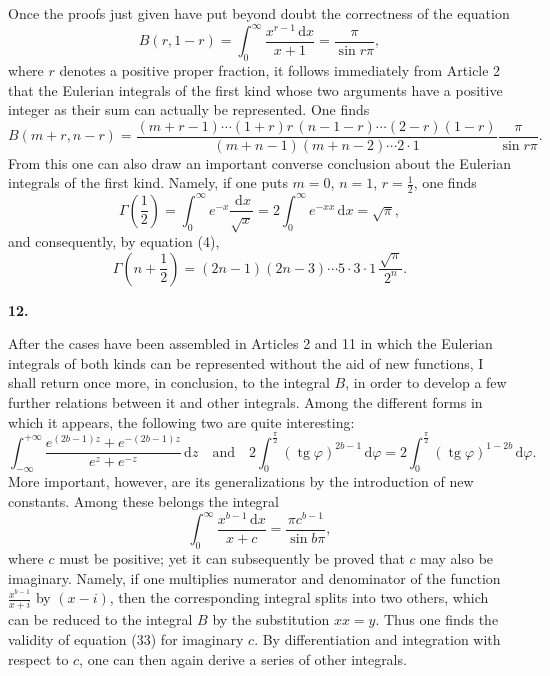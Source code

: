 \documentclass[11pt]{article}
\newcommand{\dd}{\,\mathrm d}
\newcommand{\art}[1]{\bigskip\begin{center}\large\bfseries #1.\end{center}\nopagebreak}
\newcommand{\tg}{\operatorname{tg}}
\begin{document}
Once the proofs just given have put beyond doubt the correctness of the equation
\[
B(r,1-r)=\int_0^\infty\frac{x^{r-1}\dd x}{x+1}
=\frac{\pi}{\sin r\pi},
\]
where $r$ denotes a positive proper fraction, it follows immediately from Article 2 that the Eulerian integrals of the first kind whose two arguments have a positive integer as their sum can actually be represented. One finds
\begin{equation}
B(m+r,n-r)=
\frac{(m+r-1)\cdots(1+r)r\,(n-1-r)\cdots(2-r)(1-r)}
     {(m+n-1)(m+n-2)\cdots2\cdot1}
\frac{\pi}{\sin r\pi}.
\tag{30}
\end{equation}
From this one can also draw an important converse conclusion about the Eulerian integrals of the first kind. Namely, if one puts $m=0$, $n=1$, $r=\frac12$, one finds
\begin{equation}
\Gamma\!\left(\frac12\right)
=\int_0^\infty e^{-x}\frac{\dd x}{\sqrt{x}}
=2\int_0^\infty e^{-xx}\dd x=\sqrt{\pi},
\tag{31}
\end{equation}
and consequently, by equation (4),
\begin{equation}
\Gamma\!\left(n+\frac12\right)
=(2n-1)(2n-3)\cdots5\cdot3\cdot1\,\frac{\sqrt{\pi}}{2^n}.
\tag{32}
\end{equation}

\art{12}

After the cases have been assembled in Articles 2 and 11 in which the Eulerian integrals of both kinds can be represented without the aid of new functions, I shall return once more, in conclusion, to the integral $B$, in order to develop a few further relations between it and other integrals. Among the different forms in which it appears, the following two are quite interesting:
\[
\int_{-\infty}^{+\infty}
\frac{e^{(2b-1)z}+e^{-(2b-1)z}}{e^z+e^{-z}}\dd z
\quad\text{and}\quad
2\int_0^{\frac{\pi}{2}}(\tg\varphi)^{2b-1}\dd\varphi
=2\int_0^{\frac{\pi}{2}}(\tg\varphi)^{1-2b}\dd\varphi .
\]
More important, however, are its generalizations by the introduction of new constants. Among these belongs the integral
\begin{equation}
\int_0^\infty\frac{x^{b-1}\dd x}{x+c}
=\frac{\pi c^{b-1}}{\sin b\pi},
\tag{33}
\end{equation}
where $c$ must be positive; yet it can subsequently be proved that $c$ may also be imaginary. Namely, if one multiplies numerator and denominator of the function $\frac{x^{b-1}}{x+i}$ by $(x-i)$, then the corresponding integral splits into two others, which can be reduced to the integral $B$ by the substitution $xx=y$. Thus one finds the validity of equation (33) for imaginary $c$. By differentiation and integration with respect to $c$, one can then again derive a series of other integrals.
\end{document}
